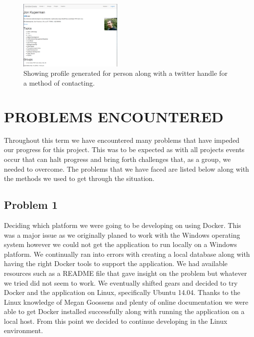 \documentclass[letterpaper,10pt,onecolumn]{IEEEtran} %
\begin{document}
\begin{enumerate}[label*=\arabic*.]
\end{enumerate}

\begin{figure}[htp]
  \begin{center}
  
  \includegraphics[width=2in]{peopleProfile}
  \centering
  \caption{Showing profile generated for person along with a twitter handle for a method of contacting. }

  \end{center}
\end{figure}

\section{PROBLEMS ENCOUNTERED}

Throughout this term we have encountered many problems that have impeded our progress for this project. This was to be expected as with all projects events occur that can halt progress and bring forth challenges that, as a group, we needed to overcome. The problems that we have faced are listed below along with the methods we used to get through the situation.

\subsection{Problem 1}
Deciding which platform we were going to be developing on using Docker. This was a major issue as we originally planed to work with the Windows operating system however we could not get the application to run locally on a Windows platform. We continually ran into errors with creating a local database along with having the right Docker tools to support the application. We had available resources such as a README file that gave insight on the problem but whatever we tried did not seem to work. We eventually shifted gears and decided to try Docker and the application on Linux, specifically Ubuntu 14.04. Thanks to the Linux knowledge of Megan Goossens and plenty of online documentation we were able to get Docker installed successfully along with running the application on a local host. From this point we decided to continue developing in the Linux environment.
\end{document}
